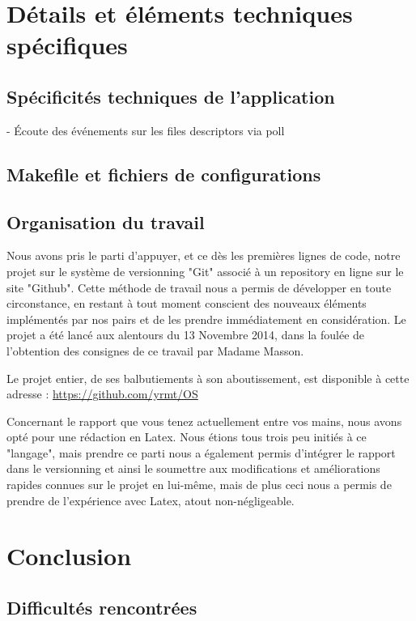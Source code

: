 \documentclass{report}
\begin{document}
{\chapter{Détails et éléments techniques spécifiques}

	\section{Spécificités techniques de l'application}

		- Écoute des événements sur les files descriptors via poll

	\section{Makefile et fichiers de configurations}

	\section{Organisation du travail}

		Nous avons pris le parti d'appuyer, et ce dès les premières lignes de code, notre projet sur le système de versionning "Git" associé
		à un repository en ligne sur le site "Github".
		Cette méthode de travail nous a permis de développer en toute circonstance, en restant à tout moment conscient des nouveaux éléments 
		implémentés par nos pairs et de les prendre immédiatement en considération.
		Le projet a été lancé aux alentours du 13 Novembre 2014, dans la foulée de l'obtention des consignes de ce travail par Madame Masson.

		Le projet entier, de ses balbutiements à son aboutissement, est disponible à cette adresse : \url{https://github.com/yrmt/OS}

		Concernant le rapport que vous tenez actuellement entre vos mains, nous avons opté pour une rédaction en Latex.
		Nous étions tous trois peu initiés à ce "langage", mais prendre ce parti nous a également permis d’intégrer le rapport
		dans le versionning et ainsi le soumettre aux modifications et améliorations rapides connues sur le projet en lui-même, mais de plus
		ceci nous a permis de prendre de l'expérience avec Latex, atout non-négligeable.

\chapter{Conclusion}
	
	\section{Difficultés rencontrées}

}
\end{document}
